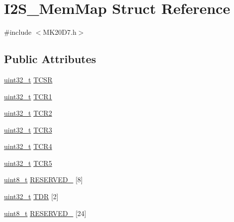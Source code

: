 \hypertarget{struct_i2_s___mem_map}{}\section{I2\+S\+\_\+\+Mem\+Map Struct Reference}
\label{struct_i2_s___mem_map}


{\ttfamily \#include $<$M\+K20\+D7.\+h$>$}

\subsection*{Public Attributes}
\begin{DoxyCompactItemize}
\item 
\hyperlink{_p_e___types_8h_a33594304e786b158f3fb30289278f5af}{uint32\+\_\+t} \hyperlink{struct_i2_s___mem_map_a6a6cb435306769616551657a370e1aec}{T\+C\+SR}
\item 
\hyperlink{_p_e___types_8h_a33594304e786b158f3fb30289278f5af}{uint32\+\_\+t} \hyperlink{struct_i2_s___mem_map_a1e90b98887869de05cc981b80e2f50b4}{T\+C\+R1}
\item 
\hyperlink{_p_e___types_8h_a33594304e786b158f3fb30289278f5af}{uint32\+\_\+t} \hyperlink{struct_i2_s___mem_map_aa3e215825b6d333e5ee6ef35541b0474}{T\+C\+R2}
\item 
\hyperlink{_p_e___types_8h_a33594304e786b158f3fb30289278f5af}{uint32\+\_\+t} \hyperlink{struct_i2_s___mem_map_a98ceb21993839e209a3634870391b6a7}{T\+C\+R3}
\item 
\hyperlink{_p_e___types_8h_a33594304e786b158f3fb30289278f5af}{uint32\+\_\+t} \hyperlink{struct_i2_s___mem_map_a933a94f14922497e04bd3178585e6288}{T\+C\+R4}
\item 
\hyperlink{_p_e___types_8h_a33594304e786b158f3fb30289278f5af}{uint32\+\_\+t} \hyperlink{struct_i2_s___mem_map_ac559d60e95112859062a4a5427ebbc61}{T\+C\+R5}
\item 
\hyperlink{_p_e___types_8h_aba7bc1797add20fe3efdf37ced1182c5}{uint8\+\_\+t} \hyperlink{struct_i2_s___mem_map_ace7d353a26bf9ea9c664a3b923aec989}{R\+E\+S\+E\+R\+V\+E\+D\+\_} \mbox{[}8\mbox{]}
\item 
\hyperlink{_p_e___types_8h_a33594304e786b158f3fb30289278f5af}{uint32\+\_\+t} \hyperlink{struct_i2_s___mem_map_a3ab91308cebaa242a4839dfb89527ea1}{T\+DR} \mbox{[}2\mbox{]}
\item 
\hyperlink{_p_e___types_8h_aba7bc1797add20fe3efdf37ced1182c5}{uint8\+\_\+t} \hyperlink{struct_i2_s___mem_map_a954e769b9c6d5ba8383cae1d6e9fa205}{R\+E\+S\+E\+R\+V\+E\+D\+\_} \mbox{[}24\mbox{]}

\end{DoxyCompactItemize}
